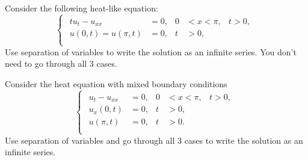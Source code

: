 \documentclass[plain]{pset}
\begin{document}
\begin{problem}
Consider the following heat-like equation:
\[
    \begin{cases}
        \begin{aligned}
            tu_t - u_{xx}             & = 0, & 0 & < x < \pi, & t > 0, \\
            u(0, t)       = u(\pi, t) & = 0, & t & > 0,                \\
        \end{aligned}
    \end{cases}
\]
Use separation of variables to write the solution as an infinite series. You don't need to go through all 3 cases.
\end{problem}
\begin{solution}

\end{solution}

\pagebreak

\begin{problem}
Consider the heat equation with mixed boundary conditions
\[
    \begin{cases}
        \begin{aligned}
            u_t - u_{xx} & = 0, & 0 & < x < \pi, & t > 0, \\
            u_x(0, t)    & = 0, & t & > 0,                \\
            u(\pi, t)    & = 0, & t & > 0.                \\
        \end{aligned}
    \end{cases}
\]
Use separation of variables and go through all 3 cases to write the solution as an infinite series.
\end{problem}
\begin{solution}

\end{solution}
\end{document}
